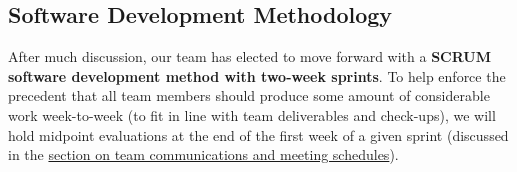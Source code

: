 \subsection{Software Development Methodology}

After much discussion, our team has elected to move forward with a \textbf{SCRUM software development method with two-week sprints}. To help enforce the precedent that all team members should produce some amount of considerable work week-to-week (to fit in line with team deliverables and check-ups), we will hold midpoint evaluations at the end of the first week of a given sprint (discussed in the \href{sec:team_comm_meeting}{section on team communications and meeting schedules}).